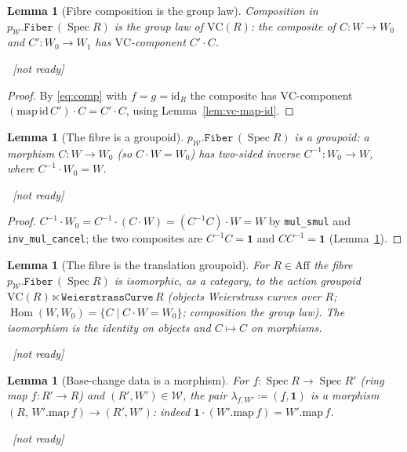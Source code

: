\documentclass[11pt]{article}
\newcommand{\lean}[1]{\par\smallskip\noindent{\footnotesize\texttt{Lean:\ #1}}\par}
\newcommand{\uses}[1]{}
\newcommand{\notready}{{\footnotesize\textcolor{red!60!black}{\ [not ready]}}}
\theoremstyle{definition}
\theoremstyle{plain}
\newtheorem{lemma}[definition]{Lemma}
\theoremstyle{remark}
\newcommand{\Aff}{\mathrm{Aff}}
\newcommand{\Spec}{\operatorname{Spec}}
\newcommand{\Weier}{\mathcal{W}}
\newcommand{\VC}{\mathrm{VC}}
\newcommand{\id}{\mathrm{id}}
\newcommand{\Hom}{\operatorname{Hom}}
\newcommand{\map}{\mathrm{map}}
\newcommand{\onel}{\mathbf 1}
\begin{document}
\begin{lemma}[Fibre composition is the group law]\label{lem:fiber-comp}
Composition in $p_{\Weier}.\mathtt{Fiber}\,(\Spec R)$ is the group law of
$\VC(R)$: the composite of $C:W\to W_0$ and $C':W_0\to W_1$ has $\VC$-component
$C'\cdot C$.
\lean{}\notready
\uses{lem:fiber-hom,def:total-comp,lem:vc-map-id}
\end{lemma}
\begin{proof}
By \eqref{eq:comp} with $f=g=\id_R$ the composite has $\VC$-component
$(\map\,\id\,C')\cdot C=C'\cdot C$, using Lemma~\ref{lem:vc-map-id}.
\end{proof}

\begin{lemma}[The fibre is a groupoid]\label{lem:fiber-groupoid}
$p_{\Weier}.\mathtt{Fiber}\,(\Spec R)$ is a groupoid: a morphism $C:W\to W_0$
(so $C\cdot W=W_0$) has two-sided inverse $C^{-1}:W_0\to W$, where
$C^{-1}\cdot W_0=W$.
\lean{}\notready
\uses{lem:fiber-hom,lem:fiber-comp,def:vc}
\end{lemma}
\begin{proof}
$C^{-1}\cdot W_0=C^{-1}\cdot(C\cdot W)=(C^{-1}C)\cdot W=W$ by \texttt{mul\_smul}
and \texttt{inv\_mul\_cancel}; the two composites are $C^{-1}C=\onel$ and
$CC^{-1}=\onel$ (Lemma~\ref{lem:fiber-comp}).
\end{proof}

\begin{lemma}[The fibre is the translation groupoid]\label{lem:fiber-descr}
For $R\in\Aff$ the fibre $p_{\Weier}.\mathtt{Fiber}\,(\Spec R)$ is isomorphic, as a
category, to the action groupoid $\VC(R)\ltimes\texttt{WeierstrassCurve}\,R$
(objects Weierstrass curves over $R$; $\Hom(W,W_0)=\{C\mid C\cdot W=W_0\}$;
composition the group law).  The isomorphism is the identity on objects and
$C\mapsto C$ on morphisms.
\lean{}\notready
\uses{lem:fiber-hom,lem:fiber-comp,lem:fiber-groupoid}
\end{lemma}

\begin{lemma}[Base-change data is a morphism]\label{lem:scart-welldef}
For $\underline f:\Spec R\to\Spec R'$ (ring map $f:R'\to R$) and
$(R',W')\in\Weier$, the pair $\lambda_{f,W'}\coloneqq(\underline f,\onel)$ is a
morphism $(R,\,W'.\map\,f)\to(R',W')$: indeed $\onel\cdot(W'.\map\,f)=W'.\map\,f$.
\lean{}\notready
\uses{def:total-hom,def:vc}
\end{lemma}
\end{document}
